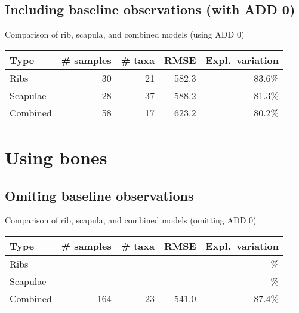 \documentclass{beamer}
\begin{document}



\subsection{Including baseline observations (with ADD 0)}

\begin{frame}{Comparison of rib, scapula, and combined models (using ADD 0)}

  \begin{tabular}{lrrrr}
    Type & \# samples & \# taxa & RMSE & Expl.\ variation\\ \hline
    Ribs & 30 & 21 & 582.3 & 83.6\% \\
    Scapulae & 28 & 37 & 588.2 & 81.3\% \\
    Combined & 58 & 17 & 623.2 & 80.2\%
  \end{tabular}

\end{frame}








\section{Using bones}


\subsection{Omiting baseline observations}

\begin{frame}{Comparison of rib, scapula, and combined models (omitting ADD 0)}

  \begin{tabular}{lrrrr}
    Type & \# samples & \# taxa & RMSE & Expl.\ variation\\ \hline
    Ribs &  &  &  & \% \\
    Scapulae & &  &  &  \% \\
    Combined & 164 & 23 & 541.0 & 87.4\%
  \end{tabular}

  \vspace{0.2in}



\end{frame}
\end{document}
